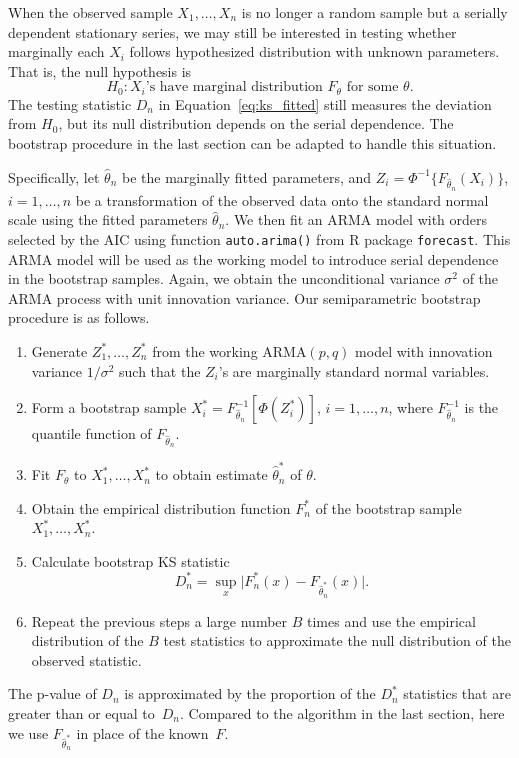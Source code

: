 \documentclass[12pt, letterpaper]{article}
\begin{document}
When the observed sample $X_1, \ldots, X_n$ is no longer a random sample but
a serially dependent stationary series, we may still be interested in testing
whether marginally each $X_i$ follows hypothesized distribution with unknown
parameters. That is, the null hypothesis is
\[
H_0: \text{$X_i$'s have marginal distribution $F_\theta$ for some $\theta$}.
\]
The testing statistic $D_n$ in Equation~\eqref{eq:ks_fitted} still measures the
deviation from $H_0$, but its null distribution depends on the serial
dependence. The bootstrap procedure in the last section can be adapted to handle
this situation.


Specifically, let $\hat\theta_n$ be the marginally fitted parameters, and
$Z_i = \Phi^{-1} \{F_{\hat\theta_n}(X_i)\}$, $i = 1, \ldots, n$ be a
transformation of the observed data onto the standard normal scale using the
fitted parameters $\hat\theta_n$. We then fit an ARMA model with orders
selected by the AIC using function \texttt{auto.arima()} from R package
\texttt{forecast}. This ARMA model will be used as the working model to
introduce serial dependence in the bootstrap samples. Again, we obtain the
unconditional variance $\sigma^2$ of the ARMA process with unit innovation
variance. Our semiparametric bootstrap procedure is as follows.

\begin{enumerate}
\item
  Generate $Z_1^*, \ldots, Z_n^*$ from the working ARMA$(p, q)$ model with
  innovation variance $1 / \sigma^2$ such that the $Z_i$'s are marginally
  standard normal variables.
\item
  Form a bootstrap sample
  $X_i^* = F_{\hat\theta_n}^{-1} [\Phi(Z_i^*)]$, $i = 1, \ldots, n$, where
  $F_{\hat\theta_n}^{-1}$ is the quantile function of $F_{\hat\theta_n}$.
\item
  Fit $F_\theta$ to $X_1^*, \ldots, X_n^*$ to obtain estimate $\hat\theta_n^*$
  of $\theta$.
\item
  Obtain the empirical distribution function $F_n^*$ of the bootstrap sample
  $X_1^*, \ldots, X_n^*$.
\item
  Calculate bootstrap KS statistic
  \[
    D_n^* = \sup_x \lvert F_n^* (x) - F_{\hat\theta_n^*} (x) \rvert.
  \]
\item
  Repeat the previous steps a large number $B$ times and use the empirical
  distribution of the $B$ test statistics to approximate
  the null distribution of the observed statistic.
\end{enumerate}
The p-value of $D_n$ is approximated by the proportion of the $D_n^*$
statistics that are greater than or equal to~$D_n$. Compared to the algorithm in
the last section, here we use $F_{\hat\theta_n^*}$ in place of the known~$F$.
\end{document}
